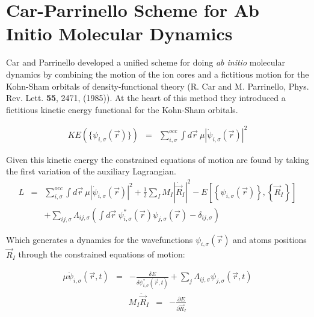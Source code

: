        

\section{Car-Parrinello Scheme for Ab Initio Molecular Dynamics}
\label{sec:pspw_Car-Parrinello}

Car and Parrinello developed a unified scheme for doing {\it ab initio}
molecular dynamics by combining the motion of the ion cores and a fictitious
motion for the Kohn-Sham orbitals of density-functional theory 
(R. Car and M. Parrinello, Phys. Rev. Lett. \textbf{55}, 2471, (1985)).  
At the heart of this method they introduced a fictitious kinetic energy 
functional for the Kohn-Sham orbitals.

\begin{eqnarray}
\label{appendix:b1}
KE(\{\psi_{i,\sigma}(\vec{r})\}) &=& \sum_{i,\sigma}^{occ} 
                                      \int d\vec{r}\ \mu \left| 
                                      \dot{\psi}_{i,\sigma}(\vec{r}) \right|^2 
\end{eqnarray}

\noindent
Given this kinetic energy the constrained equations of motion are found 
by taking the first variation of the auxiliary Lagrangian.
\begin{eqnarray}
\label{appendix:b2}
L &=& \sum_{i,\sigma}^{occ} \int d\vec{r}\ \mu \left| 
     \dot{\psi}_{i,\sigma}(\vec{r}) \right|^2 
     + \frac 12 \sum_I M_I \left| \dot{\vec{R}}_I \right|^2 
- E\left[ \left\{ \psi_{i,\sigma}(\vec{r})\right\},\left\{\vec{R}_I \right\} \right]  
\nonumber \\
&&+\sum_{ij,\sigma} \Lambda_{ij,\sigma} \left( \int d\vec{r}\ 
\psi_{i,\sigma}^{*}(\vec{r}) \psi_{j,\sigma}(\vec{r}) - \delta_{ij,\sigma} 
\right) 
\end{eqnarray}

\noindent
Which generates a dynamics for the wavefunctions $\psi_{i,\sigma}(\vec{r})$ and 
atoms positions $\vec{R}_I$ through the constrained equations of motion:

\begin{eqnarray}
\mu \ddot{\psi}_{i,\sigma}(\vec{r},t) &=& -\frac{\delta E}{\delta \psi_{i,\sigma }^{*}
\left( \vec{r},t \right) } + \sum\limits_j \Lambda_{ij,\sigma} 
\psi_{j,\sigma} \left( \vec{r},t \right)
\label{eq:b3}
\end{eqnarray}
\begin{eqnarray}
M_I \ddot{\vec{R}}_I &=& -\frac{\partial E}{\partial \vec{R}_I}
\label{eq:b4}
\end{eqnarray}

